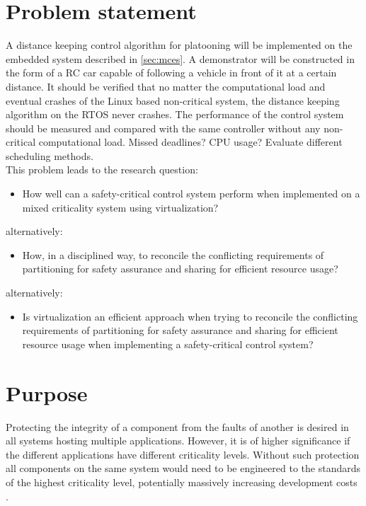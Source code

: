 \section{Problem statement}
A distance keeping control algorithm for platooning will be implemented on the embedded system described in \ref{sec:mces}. A demonstrator will be constructed in the form of a RC car capable of following a vehicle in front of it at a certain distance. It should be verified that no matter the computational load and eventual crashes of the Linux based non-critical system, the distance keeping algorithm on the RTOS never crashes. The performance of the control system should be measured and compared with the same controller without any non-critical computational load. Missed deadlines? CPU usage? Evaluate different scheduling methods.\\

This problem leads to the research question: 
\begin{itemize}
\item How well can a safety-critical control system perform when implemented on a mixed criticality system using virtualization?
\end{itemize}
alternatively:
\begin{itemize}
\item How, in a disciplined way, to reconcile the conflicting requirements of partitioning for safety assurance and sharing for efficient resource usage? \cite{burns2016}
\end{itemize}
alternatively:
\begin{itemize}
\item Is virtualization an efficient approach when trying to reconcile the conflicting requirements of partitioning for safety assurance and sharing for efficient resource usage when implementing a safety-critical control system?
\end{itemize}

\section{Purpose}
Protecting the integrity of a component from the faults of another is desired in all systems hosting multiple applications. However, it is of higher significance if the different applications have different criticality levels. Without such protection all components on the same system would need to be engineered to the standards of the highest criticality level, potentially massively increasing development costs \cite{burns2016}.

